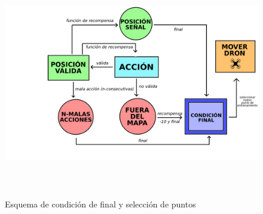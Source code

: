 \begin{figure} [t]
    \begin{center}
    \includegraphics[height=10cm]{imagenes/cap4/11_diagrama_training.png}
    \end{center}
    \caption[Esquema de condición de final y selección de puntos]{Esquema de condición de final y selección de puntos}
    \label{fig:training_phase}
\end{figure}

